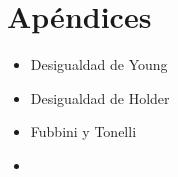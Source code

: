 
\chapter{Apéndices}\label{ap:apendice1}


\begin{itemize}
  \item Desigualdad de Young
  \item Desigualdad de Holder
  \item Fubbini y Tonelli
  \item 
\end{itemize}

\endinput
